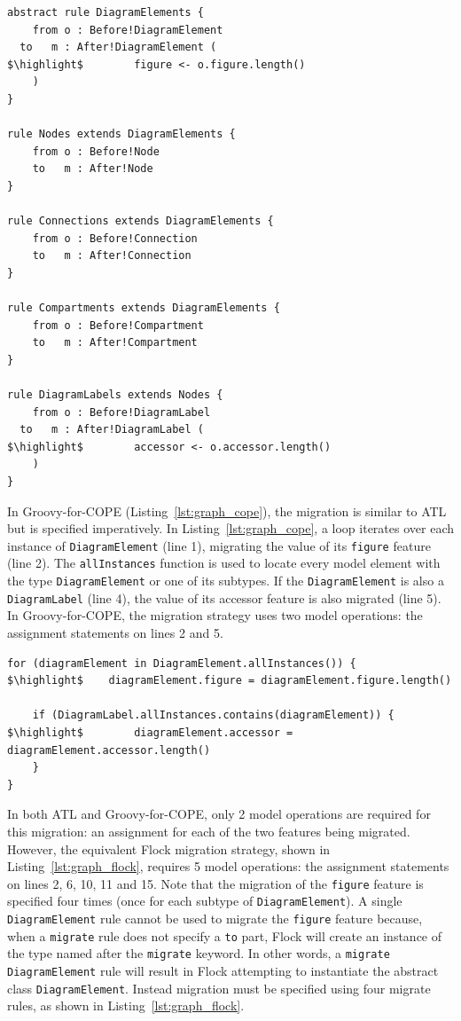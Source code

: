\begin{lstlisting}[float=tbp, caption=Simplified GMF Graph model migration in ATL, label=lst:graph_atl, language=ATL, tabsize=2]
abstract rule DiagramElements {
	from o : Before!DiagramElement
  to   m : After!DiagramElement (
$\highlight$ 		figure <- o.figure.length()
	)
}

rule Nodes extends DiagramElements {
	from o : Before!Node
	to   m : After!Node
}

rule Connections extends DiagramElements {
	from o : Before!Connection
	to   m : After!Connection
}

rule Compartments extends DiagramElements {
	from o : Before!Compartment
	to   m : After!Compartment
}

rule DiagramLabels extends Nodes {
	from o : Before!DiagramLabel
  to   m : After!DiagramLabel (
$\highlight$		accessor <- o.accessor.length()
	)
}
\end{lstlisting}

In Groovy-for-COPE (Listing~\ref{lst:graph_cope}), the migration is similar to ATL but is specified imperatively. In Listing~\ref{lst:graph_cope}, a loop iterates over each instance of \texttt{DiagramElement} (line 1), migrating the value of its \texttt{figure} feature (line 2). The \texttt{allInstances} function is used to locate every model element with the type \texttt{DiagramElement} or one of its subtypes. If the \texttt{DiagramElement} is also a \texttt{DiagramLabel} (line 4), the value of its accessor feature is also migrated (line 5). In Groovy-for-COPE, the migration strategy uses two model operations: the assignment statements on lines 2 and 5. 

\begin{lstlisting}[float=tbp, caption=Simplified GMF Graph model migration in COPE, label=lst:graph_cope, language=COPE, tabsize=2]
for (diagramElement in DiagramElement.allInstances()) {
$\highlight$	diagramElement.figure = diagramElement.figure.length()
	
	if (DiagramLabel.allInstances.contains(diagramElement)) {
$\highlight$		diagramElement.accessor = diagramElement.accessor.length()
	}
}
\end{lstlisting}

In both ATL and Groovy-for-COPE, only 2 model operations are required for this migration: an assignment for each of the two features being migrated. However, the equivalent Flock migration strategy, shown in Listing~\ref{lst:graph_flock}, requires 5 model operations: the assignment statements on lines 2, 6, 10, 11 and 15. Note that the migration of the \texttt{figure} feature is specified four times (once for each subtype of \texttt{DiagramElement}). A single \texttt{DiagramElement} rule cannot be used to migrate the \texttt{figure} feature because, when a \texttt{migrate} rule does not specify a \texttt{to} part, Flock will create an instance of the type named after the \texttt{migrate} keyword. In other words, a \texttt{migrate DiagramElement} rule will result in Flock attempting to instantiate the abstract class \texttt{DiagramElement}. Instead migration must be specified using four migrate rules, as shown in Listing~\ref{lst:graph_flock}.

